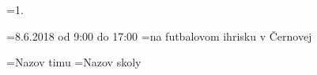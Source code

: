 \rocnik={1.}                                 %

\kedy={8.6.2018 od 9:00 do 17:00}
\kde={na futbalovom ihrisku v Černovej}

\tim={Nazov timu}
\skola={Nazov skoly}
